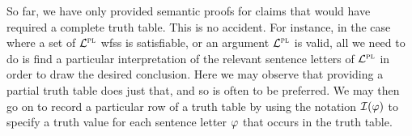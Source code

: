 So far, we have only provided semantic proofs for claims that would have required a complete truth table.
This is no accident.
For instance, in the case where a set of $\mathcal{L}^{\textsc{pl}}$ wfss is satisfiable, or an argument $\mathcal{L}^{\textsc{pl}}$ is valid, all we need to do is find a particular interpretation of the relevant sentence letters of $\mathcal{L}^{\textsc{pl}}$ in order to draw the desired conclusion. 
Here we may observe that providing a partial truth table does just that, and so is often to be preferred.
We may then go on to record a particular row of a truth table by using the notation $\mathcal{I}(\varphi)$ to specify a truth value for each sentence letter $\varphi$ that occurs in the truth table.

%
%

